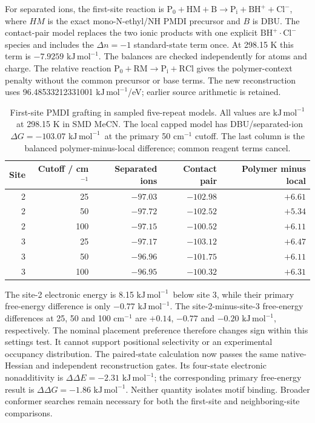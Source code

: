 \documentclass[11pt]{article}
\newcommand{\kj}{\ensuremath{\mathrm{kJ\,mol^{-1}}}}
\begin{document}
For separated ions, the first-site reaction is $\mathrm{P_0+HM+B\rightarrow P_i+BH^++Cl^-}$, where $HM$ is the exact mono-N-ethyl/NH PMDI precursor and $B$ is DBU. The contact-pair model replaces the two ionic products with one explicit $\mathrm{BH^+\cdot Cl^-}$ species and includes the $\Delta n=-1$ standard-state term once. At 298.15 K this term is $-7.9259$ \kj. The balances are checked independently for atoms and charge. The relative reaction $\mathrm{P_0+RM\rightarrow P_i+RCl}$ gives the polymer-context penalty without the common precursor or base terms. The new reconstruction uses 96.48533212331001 \kj/eV; earlier source arithmetic is retained.

\begin{table}[htbp]\centering\small
\caption{First-site PMDI grafting in sampled five-repeat models. All values are \kj\ at 298.15 K in SMD MeCN. The local capped model has DBU/separated-ion $\Delta G=-103.07$ \kj\ at the primary 50 cm$^{-1}$ cutoff. The last column is the balanced polymer-minus-local difference; common reagent terms cancel.}
\begin{tabular}{rrrrr}\toprule
Site & Cutoff / cm$^{-1}$ & Separated ions & Contact pair & Polymer minus local\\\midrule
2 & 25  & $-97.03$ & $-102.98$ & $+6.61$\\
2 & 50  & $-97.72$ & $-102.52$ & $+5.34$\\
2 & 100 & $-97.15$ & $-100.52$ & $+6.11$\\
3 & 25  & $-97.17$ & $-103.12$ & $+6.47$\\
3 & 50  & $-96.96$ & $-101.75$ & $+6.11$\\
3 & 100 & $-96.95$ & $-100.32$ & $+6.31$\\\bottomrule
\end{tabular}\label{tab:pmdifirstsite}\end{table}

The site-2 electronic energy is 8.15 \kj\ below site 3, while their primary free-energy difference is only $-0.77$ \kj. The site-2-minus-site-3 free-energy differences at 25, 50 and 100 cm$^{-1}$ are $+0.14$, $-0.77$ and $-0.20$ \kj, respectively. The nominal placement preference therefore changes sign within this settings test. It cannot support positional selectivity or an experimental occupancy distribution. The paired-state calculation now passes the same native-Hessian and independent reconstruction gates. Its four-state electronic nonadditivity is $\Delta\Delta E=-2.31$ \kj; the corresponding primary free-energy result is $\Delta\Delta G=-1.86$ \kj. Neither quantity isolates motif binding. Broader conformer searches remain necessary for both the first-site and neighboring-site comparisons.
\end{document}
